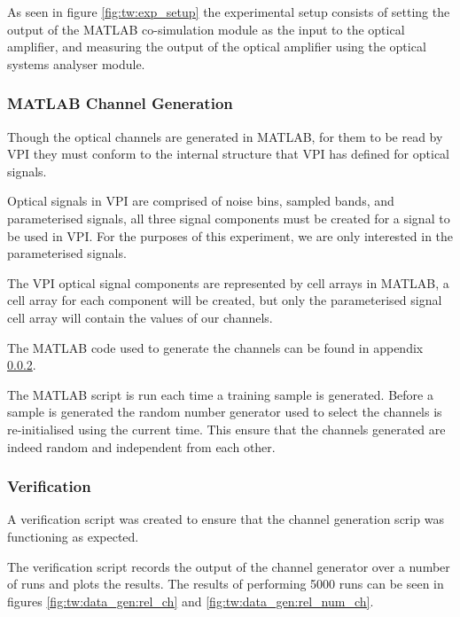 As seen in figure \ref{fig:tw:exp_setup} the experimental setup consists of setting the output of the MATLAB co-simulation module as the input to the optical amplifier, and measuring the output of the optical amplifier using the optical systems analyser module. 


\subsubsection{MATLAB Channel Generation}

Though the optical channels are generated in MATLAB, for them to be read by VPI they must conform to the internal structure that VPI has defined for optical signals. 

Optical signals in VPI are comprised of noise bins, sampled bands, and parameterised signals, all three signal components must be created for a signal to be used in VPI. 
For the purposes of this experiment, we are only interested in the parameterised signals.

The VPI optical signal components are represented by cell arrays in MATLAB, a cell array for each component will be created, but only the parameterised signal cell array will contain the values of our channels.  

The MATLAB code used to generate the channels can be found in appendix \ref{}.

The MATLAB script is run each time a training sample is generated. Before a sample is generated the random number generator used to select the channels is re-initialised using the current time. This ensure that the channels generated are indeed random and independent from each other. 



\subsubsection{Verification}

A verification script was created to ensure that the channel generation scrip was functioning as expected.

The verification script records the output of the channel generator over a number of runs and plots the results. The results of performing 5000 runs can be seen in figures \ref{fig:tw:data_gen:rel_ch} and \ref{fig:tw:data_gen:rel_num_ch}. 

